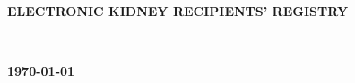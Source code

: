 \documentclass[12pt,a4paper]{report}
\begin{document}
\begin{titlepage}


\center %
{

\vspace*{\fill}
\fontsize{20pt}{30}\selectfont \textbf{\uppercase{ELECTRONIC KIDNEY RECIPIENTS' REGISTRY}}\\[1.5cm]
\vspace*{\fill}

\fontsize{16pt}{24}\selectfont{B GNANAKEETHAN} \\


\vspace*{\fill}

\fontsize{16pt}{24}\selectfont\textbf{\monthyeardate\today}
}

\vspace*{\fill}

\end{titlepage}
\end{document}
